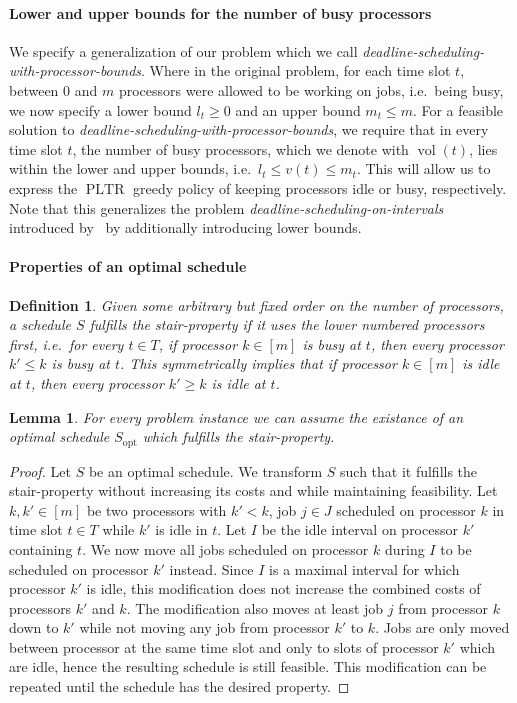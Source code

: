\documentclass[a4paper]{article}
\DeclareMathOperator{\opt}{opt}
\DeclareMathOperator{\PLTR}{PLTR}
\DeclareMathOperator{\vol}{vol}
\newtheorem{lemma}[theorem]{Lemma}
\newtheorem{definition}[theorem]{Definition}
\begin{document}
\paragraph{Lower and upper bounds for the number of busy processors}
We specify a generalization of our problem which we call \emph{deadline-scheduling-with-processor-bounds}.
Where in the original problem, for each time slot $t$, between $0$ and $m$ processors were allowed to be working on jobs, i.e.\ being busy, we now specify a lower bound $l_t \geq 0$ and an upper bound $m_t \leq m$.
For a feasible solution to \emph{deadline-scheduling-with-processor-bounds}, we require that in every time slot $t$, the number of busy processors, which we denote with $\vol(t)$, lies within the lower and upper bounds, i.e.\ $l_t \leq v(t) \leq m_t$.
This will allow us to express the $\PLTR$ greedy policy of keeping processors idle or busy, respectively.
Note that this generalizes the problem \emph{deadline-scheduling-on-intervals} introduced by~\cite{antoniadis} by additionally introducing lower bounds.

\paragraph{Properties of an optimal schedule}
\begin{definition}\label{def:stair_property}
  Given some arbitrary but fixed order on the number of processors, a schedule $S$ fulfills the \emph{stair-property} if it uses the lower numbered processors first, i.e.\ for every $t \in T$, if processor $k \in [m]$ is busy at $t$, then every processor $k' \leq k$ is busy at $t$.
  This symmetrically implies that if processor $k \in [m]$ is idle at $t$, then every processor $k' \geq k$ is idle at $t$.
\end{definition}

\begin{lemma}\label{lemma:stair_property_opt}
  For every problem instance we can assume the existance of an optimal schedule $S_{\opt}$ which fulfills the stair-property.
\end{lemma}
\begin{proof}
  Let $S$ be an optimal schedule.
  We transform $S$ such that it fulfills the stair-property without increasing its costs and while maintaining feasibility.
  Let $k, k' \in [m]$ be two processors with $k' < k$, job $j \in J$ scheduled on processor $k$ in time slot $t \in T$ while $k'$ is idle in $t$.
  Let $I$ be the idle interval on processor $k'$ containing $t$.
  We now move all jobs scheduled on processor $k$ during $I$ to be scheduled on processor $k'$ instead.
  Since $I$ is a maximal interval for which processor $k'$ is idle, this modification does not increase the combined costs of processors $k'$ and $k$.
  The modification also moves at least job $j$ from processor $k$ down to $k'$ while not moving any job from processor $k'$ to $k$.
  Jobs are only moved between processor at the same time slot and only to slots of processor $k'$ which are idle, hence the resulting schedule is still feasible.
  This modification can be repeated until the schedule has the desired property.
\end{proof}
\end{document}
